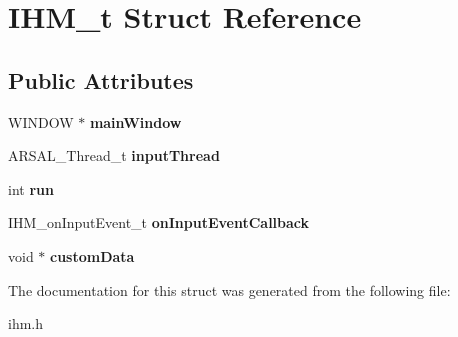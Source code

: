 \hypertarget{structIHM__t}{}\section{I\+H\+M\+\_\+t Struct Reference}
\label{structIHM__t}
\subsection*{Public Attributes}
\begin{DoxyCompactItemize}
\item 
\hypertarget{structIHM__t_a054e97c316934e2c096851218b77eeb0}{}W\+I\+N\+D\+O\+W $\ast$ {\bfseries main\+Window}\label{structIHM__t_a054e97c316934e2c096851218b77eeb0}

\item 
\hypertarget{structIHM__t_a26a01f7024501c6f6cb265a3ec63b51d}{}A\+R\+S\+A\+L\+\_\+\+Thread\+\_\+t {\bfseries input\+Thread}\label{structIHM__t_a26a01f7024501c6f6cb265a3ec63b51d}

\item 
\hypertarget{structIHM__t_a55f137fec8f1a4c6e7f750e867c5f572}{}int {\bfseries run}\label{structIHM__t_a55f137fec8f1a4c6e7f750e867c5f572}

\item 
\hypertarget{structIHM__t_a02dfaefc359fb07336c9489fd8218430}{}I\+H\+M\+\_\+on\+Input\+Event\+\_\+t {\bfseries on\+Input\+Event\+Callback}\label{structIHM__t_a02dfaefc359fb07336c9489fd8218430}

\item 
\hypertarget{structIHM__t_a7c9f6f8a2f01a3418c4690708b8cb910}{}void $\ast$ {\bfseries custom\+Data}\label{structIHM__t_a7c9f6f8a2f01a3418c4690708b8cb910}

\end{DoxyCompactItemize}


The documentation for this struct was generated from the following file\+:\begin{DoxyCompactItemize}
\item 
ihm.\+h\end{DoxyCompactItemize}
